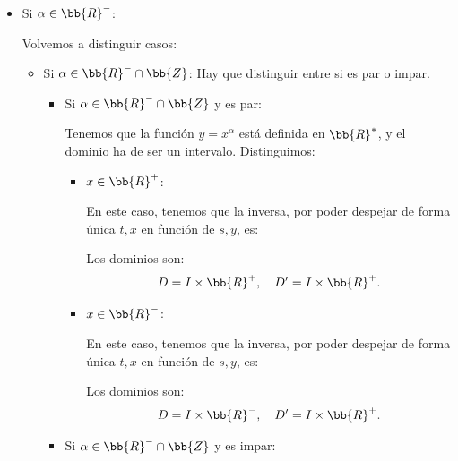 \documentclass[12pt]{article}
\begin{document}
\begin{ejercicio}[6 puntos]
\begin{enumerate}
\begin{itemize}
            \item Si $\alpha\in \bb{R}^-$:
            
            Volvemos a distinguir casos:
            \begin{itemize}
                \item Si $\alpha\in \bb{R}^-\cap \bb{Z}$: Hay que distinguir entre si es par o impar.
                \begin{itemize}
                    \item Si $\alpha\in \bb{R}^-\cap \bb{Z}$ y es par:
                    
                    Tenemos que la función $y=x^\alpha$ está definida en $\bb{R}^\ast$, y el dominio ha de ser un intervalo. Distinguimos:
                    \begin{itemize}
                        \item $x\in \bb{R}^+$:
                        
                        En este caso, tenemos que la inversa, por poder despejar de forma única $t,x$ en función de $s,y$, es:

                        Los dominios son:
                        \begin{align*}
                            D=I \times \bb{R}^+,\quad D'=I \times \bb{R}^+.
                        \end{align*}

                        \item $x\in \bb{R}^-$:
                        
                        En este caso, tenemos que la inversa, por poder despejar de forma única $t,x$ en función de $s,y$, es:

                        Los dominios son:
                        \begin{align*}
                            D=I \times \bb{R}^-,\quad D'=I \times \bb{R}^+.
                        \end{align*}
                    \end{itemize}

                    \item Si $\alpha\in \bb{R}^-\cap \bb{Z}$ y es impar:
                    

\end{itemize}
\end{itemize}
\end{itemize}
\end{enumerate}
\end{ejercicio}
\end{document}
